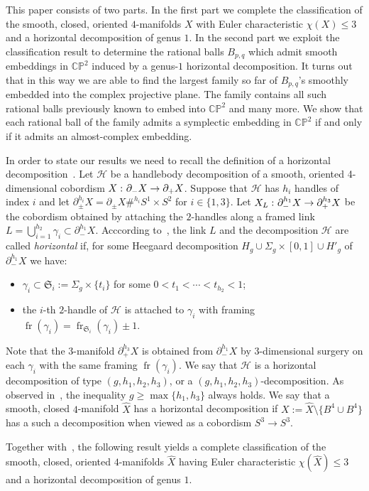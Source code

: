 \documentclass[11pt,a4paper]{amsart}
\newcommand{\CP}{\mathbb{CP}}
\newcommand{\fS}{\mathfrak{S}}
\newcommand{\ga}{\gamma}
\newcommand{\Si}{\Sigma}
\newcommand{\x}{\times}
\newcommand{\del}{\partial}
\renewcommand{\H}{\mathcal H}
\newcommand{\co}{\thinspace\colon}
\DeclareMathOperator{\fr}{fr}
\theoremstyle{definition}
\numberwithin{equation}{section}
\begin{document}
This paper consists of two parts. In the first part we complete the classification of the 
smooth, closed, oriented $4$-manifolds $X$ with Euler characteristic $\chi(X)\leq 3$ and a 
horizontal decomposition of genus $1$. In the second part we exploit the classification 
result to determine the rational balls $B_{p,q}$ which admit smooth embeddings 
in $\CP^2$ induced by a genus-$1$ horizontal decomposition. It turns out that in this 
way we are able to find the largest family so far of $B_{p,q}$'s smoothly 
embedded into the complex projective plane. The family contains all such rational balls 
previously known to embed into $\CP^2$ and many more. We show that each rational ball of the family 
admits a symplectic embedding in $\CP^2$ if and only if it admits an almost-complex 
embedding. 

In order to state our results we need to recall the definition of a horizontal decomposition~\cite{LP22-2}. 
Let $\H$ be a handlebody decomposition of a smooth, oriented 4-dimensional cobordism $X\co\del_- X\to\del_+ X$. 
Suppose that $\H$ has $h_i$ handles of index $i$ and let $\del_\pm^{h_i} X = \del_\pm X\#^{h_i} S^1\x S^2$ for $i\in\{1,3\}$. 
Let $X_L\co\del_-^{h_1} X\to \del_+^{h_3} X$ be the cobordism obtained by attaching the $2$-handles along a framed link $L = \bigcup_{i=1}^{h_2} \ga_i\subset \del_-^{h_1} X$. 
Acccording to~\cite{LP22-2}, the link $L$ and the decomposition $\H$ are called {\em horizontal} 
if, for some Heegaard decomposition $H_g\cup\Si_g\x [0,1]\cup H'_g$ of $\del_-^{h_1} X$ 
we have: 
\begin{itemize}
\item 
$\ga_i\subset\fS_i:=\Si_g\x\{t_i\}$ for some $0<t_1<\cdots <t_{h_2}<1$; 
\item 
the $i$-th $2$-handle of $\H$ is attached 
to $\ga_i$ with framing $\fr(\ga_i) = \fr_{\fS_i}(\ga_i)\pm 1$.
\end{itemize}
Note that the $3$-manifold 
$\del_+^{h_3} X$ is obtained from $\del_-^{h_1} X$ by $3$-dimensional 
surgery on each $\ga_i$ with the same framing $\fr(\ga_i)$. We say 
that $\H$ is a horizontal decomposition of type $(g,h_1,h_2,h_3)$, or a 
$(g,h_1,h_2,h_3)$-decomposition. As observed in~\cite[Section~1]{LP22-2}, 
the inequality $g\geq\max\{h_1,h_3\}$ always holds. We say that a smooth, 
closed $4$-manifold $\hat X$ has a horizontal decomposition 
if $X:=\hat X\setminus\{B^4\cup B^4\}$ has a such a decomposition 
when viewed as a cobordism $S^3\to S^3$.

Together with~\cite[Theorem~1.7]{LP22-2}, the following result yields a complete 
classification of the smooth, closed, oriented $4$-manifolds $\hat X$ having Euler characteristic 
$\chi(\hat X)\leq 3$ and a horizontal decomposition of genus $1$.
\end{document}
